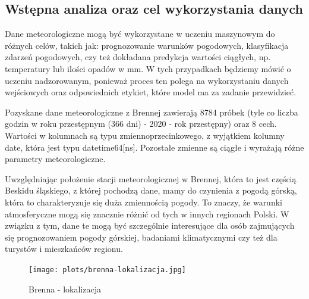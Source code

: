 \documentclass[10pt,a4paper]{article}
\begin{document}
\subsection*{Wstępna analiza oraz cel wykorzystania danych}
Dane meteorologiczne mogą być wykorzystane w uczeniu maszynowym do różnych celów, takich jak: prognozowanie warunków pogodowych, klasyfikacja zdarzeń pogodowych, czy też dokładana predykcja wartości ciągłych, np. temperatury lub ilości opadów w mm. W tych przypadkach będziemy mówić o uczeniu nadzorowanym, ponieważ proces ten polega na wykorzystaniu danych wejściowych oraz odpowiednich etykiet, które model ma za zadanie przewidzieć.
\par
\hspace{0.75cm}
Pozyskane dane meteorologiczne z Brennej zawierają 8784 próbek (tyle co liczba godzin w roku przestępnym (366 dni) - 2020 - rok przestępny) oraz 8 cech. Wartości w kolumnach są typu zmiennoprzecinkowego, z wyjątkiem kolumny date, która jest typu datetime64[ns]. Pozostałe zmienne są ciągłe i wyrażają różne parametry meteorologiczne.
\par
\hspace{0.75cm}
Uwzględniając położenie stacji meteorologicznej w Brennej, która to jest częścią Beskidu śląskiego, z której pochodzą dane, mamy do czynienia z pogodą górską, która to charakteryzuje się duża zmiennością pogody. To znaczy, że warunki atmosferyczne mogą się znacznie różnić od tych w innych regionach Polski. W związku z tym, dane te mogą być szczególnie interesujące dla osób zajmujących się prognozowaniem pogody górskiej, badaniami klimatycznymi czy też dla turystów i mieszkańców regionu.
\begin{figure}[h]
	\centering
	\texttt{[image: plots/brenna-lokalizacja.jpg]}
	\caption{Brenna - lokalizacja}
	\label{fig:my_label}
\end{figure}
\end{document}
